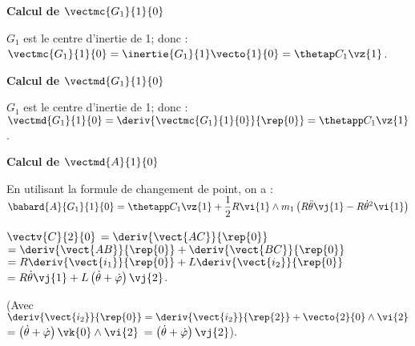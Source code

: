 \textbf{Calcul de $\vectmc{G_1}{1}{0}$}

$G_1$ est le centre d'inertie de 1; donc : 
$\vectmc{G_1}{1}{0} = \inertie{G_1}{1}\vecto{1}{0} = \thetap C_1 \vz{1}$.

\textbf{Calcul de $\vectmd{G_1}{1}{0}$}

$G_1$ est le centre d'inertie de 1; donc : 
$\vectmd{G_1}{1}{0} = \deriv{\vectmc{G_1}{1}{0}}{\rep{0}} = \thetapp C_1 \vz{1}$.

\textbf{Calcul de $\vectmd{A}{1}{0}$}

En utilisant la formule de changement de point, on a : 
$\babard{A}{G_1}{1}{0} = \thetapp C_1 \vz{1} + \dfrac{1}{2}R\vi{1} \wedge m_1 \left( R\ddot{\theta}\vj{1} - R\dot{\theta}^2\vi{1}\right)$

\else
\fi

\ifprof

$\vectv{C}{2}{0}$ $ = \deriv{\vect{AC}}{\rep{0}}$
$ = \deriv{\vect{AB}}{\rep{0}}+\deriv{\vect{BC}}{\rep{0}}$
$ = R\deriv{\vect{i_1}}{\rep{0}}+L\deriv{\vect{i_2}}{\rep{0}}$
$ = R\dot{\theta}\vj{1}+L\left( \dot{\theta}+\dot{\varphi}\right)\vj{2}$.

(Avec $\deriv{\vect{i_2}}{\rep{0}} = \deriv{\vect{i_2}}{\rep{2}} + \vecto{2}{0}\wedge \vi{2}$
$ = \left( \dot{\theta}+\dot{\varphi}\right)\vk{0}\wedge \vi{2}$ $ = \left( \dot{\theta}+\dot{\varphi}\right)\vj{2}$).

\else
\fi

\ifprof
\else
\fi

\ifcolle
{}
\else
\fi


\ifprof
\else


\fi